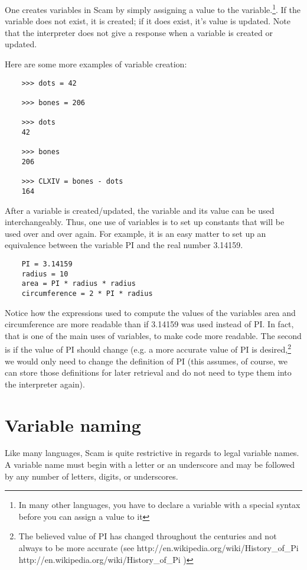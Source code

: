 One creates variables in Scam by simply assigning a value
to the variable.\footnote{
In many other languages, you have to declare a variable
with a special syntax before you can assign a value
to it}. If the variable does not exist, it is created;
if it does exist, it's value is updated.
Note that the interpreter does not give a response
when a variable is created or updated.

Here are some more examples of variable creation:

\begin{verbatim}
    >>> dots = 42

    >>> bones = 206

    >>> dots
    42

    >>> bones
    206

    >>> CLXIV = bones - dots
    164
\end{verbatim}

After a variable is created/updated,
the variable and its value can be used interchangeably.
Thus,
one use of variables is to set up constants that
will be used over and over again.
For example,
it is an easy matter to
set up an equivalence between the variable {\sf PI} and the real number 3.14159.

\begin{verbatim}
    PI = 3.14159
    radius = 10
    area = PI * radius * radius
    circumference = 2 * PI * radius
\end{verbatim}

Notice how the expressions used to compute the values of the variables
area and circumference are more readable than if 3.14159 was used
instead of {\sf PI}.
In fact,
that is one of the main uses of variables,
to
make code more readable.
The second is if the value of {\sf PI} should change
(e.g. a more accurate value of {\sf PI} is desired,\footnote{
The believed value of {\sf PI} has changed throughout the centuries and not
always to be more accurate (see
\xlink
{http://en.wikipedia.org/wiki/History\_of\_Pi}
{http://en.wikipedia.org/wiki/History\_of\_Pi}
)
}
we would only need
to change the definition of {\sf PI} (this assumes,
of course,
we can store
those definitions for later retrieval and do not need to type them into
the interpreter again).

\section{Variable naming}

Like many languages,
Scam is quite restrictive in regards to legal variable names.
A variable name must begin with a letter or an underscore
and may be followed by any number of letters, digits, or
underscores.

